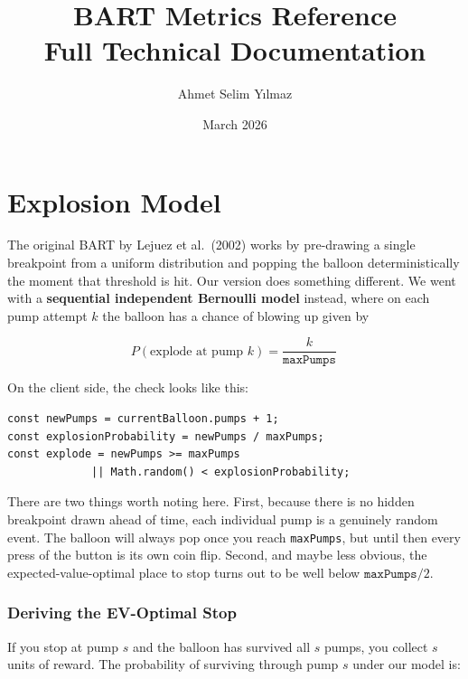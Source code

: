 \documentclass[11pt,a4paper]{article}
\title{\textbf{BART Metrics Reference}\\[0.3em]
\large Full Technical Documentation}
\author{Ahmet Selim Y{\i}lmaz}
\date{March 2026}
\begin{document}
\maketitle
\thispagestyle{fancy}

\tableofcontents
\newpage


\section{Explosion Model}

The original BART by Lejuez et al.\ (2002) works by pre-drawing a single breakpoint
from a uniform distribution and popping the balloon deterministically the moment
that threshold is hit. Our version does something different. We went with a
\textbf{sequential independent Bernoulli model} instead, where on each pump
attempt $k$ the balloon has a chance of blowing up given by

\begin{equation}
\label{eq:explosion}
P(\text{explode at pump } k) = \frac{k}{\texttt{maxPumps}}\,
\end{equation}

On the client side, the check looks like this:

\begin{lstlisting}[style=tsstyle,caption={Explosion check (TypeScript, client-side).}]
const newPumps = currentBalloon.pumps + 1;
const explosionProbability = newPumps / maxPumps;
const explode = newPumps >= maxPumps
             || Math.random() < explosionProbability;
\end{lstlisting}

There are two things worth noting here.
First, because there is no hidden breakpoint drawn ahead of time, each individual
pump is a genuinely random event. The balloon will always pop once you reach
\texttt{maxPumps}, but until then every press of the button is its own coin flip.
Second, and maybe less obvious, the expected-value-optimal place to stop turns out
to be well below $\texttt{maxPumps}/2$.

\subsubsection*{Deriving the EV-Optimal Stop}

If you stop at pump $s$ and the balloon has survived all $s$ pumps, you collect
$s$ units of reward. The probability of surviving through pump $s$ under our
model is:
\end{document}
